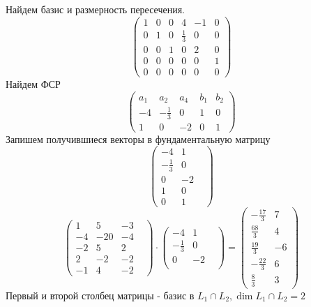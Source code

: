 	Найдем базис и размерность пересечения. 
	$$\begin{pmatrix}
		1 & 0 & 0 & 4 & -1 & 0 \\
		0 & 1 & 0 & \frac13 & 0 & 0 \\
		0 & 0 & 1 & 0 & 2 & 0 \\
		0 & 0 & 0 & 0 & 0 & 1 \\
		0 & 0 & 0 & 0 & 0 & 0
	\end{pmatrix}$$
	Найдем ФСР 
	$$\begin{pmatrix}
		a_1 & a_2 & a_4 & b_1 & b_2 \\ 
		-4 & -\frac13 & 0 & 1 & 0 \\
		1 & 0 & -2 & 0 & 1 
	\end{pmatrix}$$
	Запишем получившиеся векторы в фундаментальную матрицу
	 $$\begin{pmatrix}
	 	-4 & 1 \\
	 	-\frac13 & 0 \\
	 	0 & -2 & \\
	 	1 & 0 \\
	 	0 &  1 
	 \end{pmatrix}$$
$$\begin{pmatrix}
	1 & 5 &  -3 & \\
	-4 & -20  & -4 \\
	-2 & 5  & 2 \\
	2 & -2  & -2 \\
	-1 & 4 & -2 
\end{pmatrix}\cdot \begin{pmatrix}
	-4 & 1 \\
-\frac13 & 0 \\
0 & -2 & \\
\end{pmatrix} = \begin{pmatrix}
-\frac{17}{3} & 7 \\
\frac{68}{3} & 4 \\
\frac{19}{3} & -6 \\
-\frac{22}{3} & 6 \\
\frac83 & 3
\end{pmatrix}$$
Первый и второй столбец матрицы - базис в $L_1 \cap L_2, \dim L_1 \cap L_2 = 2$
